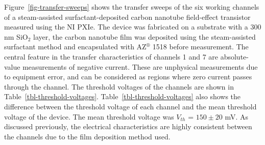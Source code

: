 \documentclass[
  a4paper,
]{scrbook}
\begin{document}
Figure~\ref{fig-transfer-sweeps} shows the transfer sweeps of the six
working channels of a steam-assisted surfactant-deposited carbon
nanotube field-effect transistor measured using the NI PXIe. The device
was fabricated on a substrate with a 300 nm SiO\(_{2}\) layer, the
carbon nanotube film was deposited using the steam-assisted surfactant
method and encapsulated with AZ\(^\circledR\) 1518 before measurement.
The central feature in the transfer characteristics of channels 1 and 7
are absolute-value measurements of negative current. These are
unphysical measurements due to equipment error, and can be considered as
regions where zero current passes through the channel. The threshold
voltages of the channels are shown in
Table~\ref{tbl-threshold-voltages}. Table~\ref{tbl-threshold-voltages}
also shows the difference between the threshold voltage of each channel
and the mean threshold voltage of the device. The mean threshold voltage
was \(V_{th}\) = \(150 \pm 20\) mV. As discussed previously, the
electrical characteristics are highly consistent between the channels
due to the film deposition method used.
\end{document}
